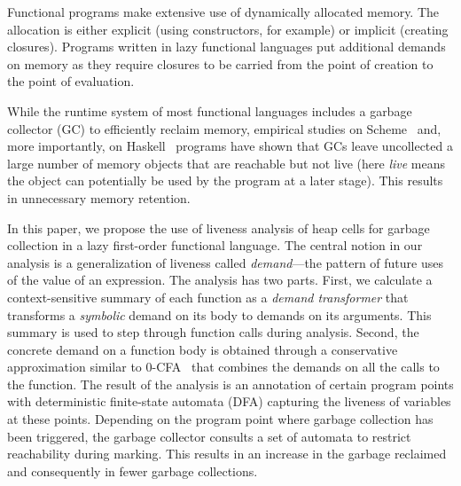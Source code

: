 \documentclass[preprint,9pt]{sigplanconf}
\begin{document}
Functional programs make extensive use of dynamically allocated
memory.  The
allocation  is either  explicit (using  constructors, for example) or
implicit (creating  closures).  Programs  written in  lazy
functional languages put additional  demands on memory as they require
closures to  be carried  from the  point of creation  to the  point of
evaluation.

While  the runtime  system  of most  functional  languages includes  a
garbage  collector  (GC)  to  efficiently  reclaim  memory,  empirical
studies on Scheme~\cite{karkare06effectiveness} and, more importantly,
on  Haskell~\cite{rojemo96lag}  programs  have shown  that  GCs  leave
uncollected a  large number of  memory objects that are  reachable but
not live (here {\em live} means  the object can potentially be used by
the program  at a  later stage).  This  results in  unnecessary memory
retention.

In this paper,  we propose the use of liveness  analysis of heap cells
for garbage collection in a lazy first-order functional language.  The
central notion in our analysis  is a generalization of liveness called
{\em  demand}---the  pattern  of  future  uses  of  the  value  of  an
expression.   The  analysis has  two  parts.   First, we  calculate  a
context-sensitive  summary   of  each   function  as  a   {\em  demand
  transformer} that transforms a {\em  symbolic} demand on its body to
demands  on its  arguments.   This  summary is  used  to step  through
function  calls during  analysis.  Second,  the concrete  demand on  a
function  body is  obtained through  a conservative approximation
similar to 0-CFA~\cite{Shivers:1988} that combines the  demands on all the calls
to  the function.   The result  of the  analysis is  an annotation  of
certain program points with  deterministic finite-state automata (DFA)
capturing the liveness of variables at these points.  Depending on the
program point where garbage collection has been triggered, the garbage
collector consults a  set of automata to  restrict reachability during
marking.  This  results in  an increase in  the garbage  reclaimed and
consequently in fewer garbage collections.
\end{document}
